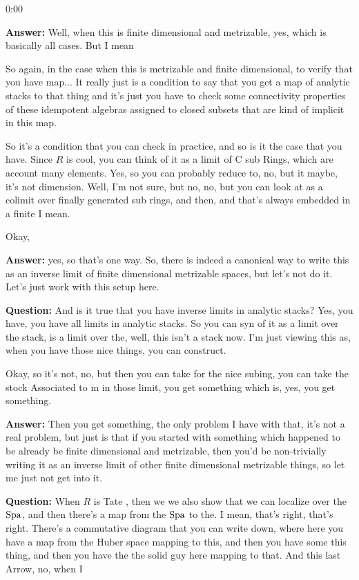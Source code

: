 \begin{unfinished}{0:00}
{\textbf{Answer:} Well, when this is finite dimensional and metrizable, yes, which is basically all cases. But I mean 

So again, in the case when this is metrizable and finite dimensional, to verify that you have map... It really just is a condition to say that you get a map of analytic stacks to that thing and it's just you have to check some connectivity properties of these idempotent algebras assigned to closed subsets that are kind of implicit in this map.

So it's a condition that you can check in practice, and so is it the case that you have. Since $R$ is cool, you can think of it as a limit of C sub Rings, which are account many elements. Yes, so you can probably reduce to, no, but it maybe, it's not dimension. Well, I'm not sure, but no, no, but you can look at as a colimit over finally generated sub rings, and then, and that's always embedded in a finite I mean.


Okay, 

\textbf{Answer:} yes, so that's one way. So, there is indeed a canonical way to write this as an inverse limit of finite dimensional metrizable spaces, but let's not do it. Let's just work with this setup here. 


\textbf{Question:} And is it true that you have inverse limits in analytic stacks? Yes, you have, you have all limits in analytic stacks. So you can syn of it as a limit over the stack, is a limit over the, well, this isn't a stack now. I'm just viewing this as, when you have those nice things, you can construct.

Okay, so it's not, no, but then you can take for the nice subing, you can take the stock Associated to m in those limit, you get something which is, yes, you get something. 


\textbf{Answer:} Then you get something, the only problem I have with that, it's not a real problem, but just is that if you started with something which happened to be already be finite dimensional and metrizable, then you'd be non-trivially writing it as an inverse limit of other finite dimensional metrizable things, so let me just not get into it.

\textbf{Question:} When $R$ is Tate , then we we also show that we can localize over the $\operatorname{Spa}$, and then there's a map from the $\operatorname{Spa}$ to the. I mean, that's right, that's right. 
There's a commutative diagram that you can write down, where here you have a map from the Huber space mapping to this, and then you have some this thing, and then you have the the solid guy here mapping to that. And this last Arrow, no, when I 

}
\end{unfinished}
